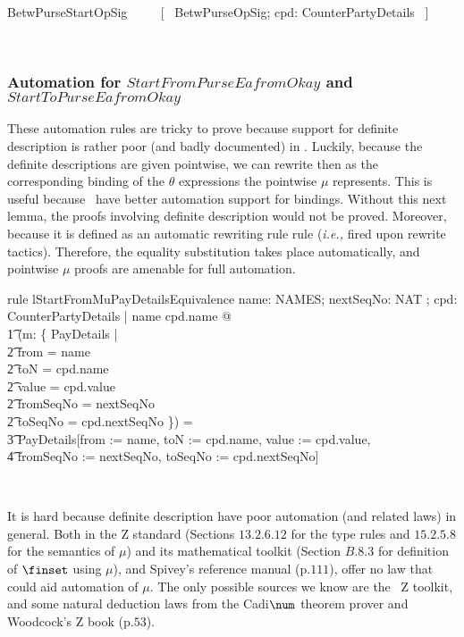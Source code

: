 \begin{LNewSDef}
\begin{zed}
   BetwPurseStartOpSig ~~~~ [~ BetwPurseOpSig; cpd: CounterPartyDetails ~]
\end{zed}~\end{LNewSDef}

\subsubsection*{Automation for $StartFromPurseEafromOkay$ and $StartToPurseEafromOkay$}

These automation rules are tricky to prove because support for definite
description is rather poor (and badly documented) in \zeves. Luckily, because
the definite descriptions are given pointwise, we can rewrite then as the
corresponding binding of the $\theta$ expressions the pointwise $\mu$
represents. This is useful because \zeves\ have better automation support for
bindings. Without this next lemma, the proofs involving definite description
would not be proved. Moreover, because it is defined as an automatic rewriting
rule rule (\textit{i.e.,} fired upon \textsf{rewrite} tactics). Therefore, the
equality substitution takes place automatically, and pointwise $\mu$ proofs are
amenable for full automation.
%
\begin{LRRT}
\begin{theorem}{rule lStartFromMuPayDetailsEquivalence}
   \forall name: NAMES; nextSeqNo: NAT ; cpd: CounterPartyDetails | name \neq cpd.name @ \\
      \t1 (\mu  m: \{  PayDetails | \\
            \t2 from = name \\
            \t2 \land  toN = cpd.name \\
            \t2 \land value = cpd.value \\
            \t2 \land  fromSeqNo = nextSeqNo \\
            \t2 \land  toSeqNo = cpd.nextSeqNo \}) = \\
            \t3 \theta  PayDetails[from := name, toN := cpd.name, value := cpd.value, \\
                \t4 fromSeqNo := nextSeqNo, toSeqNo := cpd.nextSeqNo]
\end{theorem}~\end{LRRT}
%
It is hard because definite description have poor automation (and related
laws) in general. Both in the Z standard (Sections $13.2.6.12$ for the type
rules and $15.2.5.8$ for the semantics of $\mu$) and its mathematical toolkit
(Section $B.8.3$ for definition of $\finset$ using $\mu$), and Spivey's
reference manual (p.$111$), offer no law that could aid automation of $\mu$.
The only possible sources we know are the \zeves\ Z toolkit, and some natural
deduction laws from the Cadi$\num$ theorem prover and Woodcock's Z book
(p.$53$).


